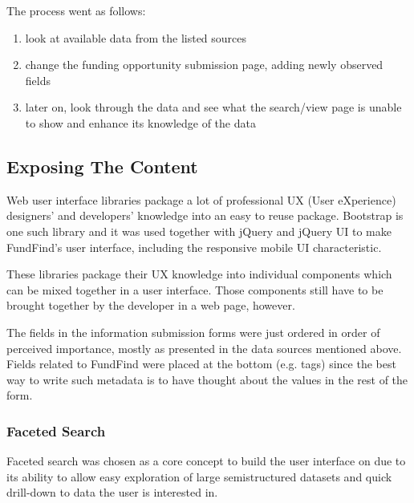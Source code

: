 The process went as follows:
\begin{enumerate}
\item look at available data from the listed sources
\item change the funding opportunity submission page, adding newly observed fields
\item later on, look through the data and see what the search/view page is unable to show and enhance its knowledge of the data
\end{enumerate}

\subsection{Exposing The Content}
\label{design-ui-exposing-the-content}
Web user interface libraries package a lot of professional UX (User eXperience) designers' and developers' knowledge into an easy to reuse package. Bootstrap \cite{bootstrap} is one such library and it was used together with jQuery \cite{jquery} and jQuery UI\cite{jquery-ui} to make FundFind's user interface, including the responsive mobile UI characteristic.

These libraries package their UX knowledge into individual components which can be mixed together in a user interface. Those components still have to be brought together by the developer in a web page, however.

The fields in the information submission forms were just ordered in order of perceived importance, mostly as presented in the data sources mentioned above. Fields related to FundFind were placed at the bottom (e.g. tags) since the best way to write such metadata is to have thought about the values in the rest of the form.

\subsubsection{Faceted Search}
\label{faceted-search}
Faceted search \cite{faceted} was chosen as a core concept to build the user interface on due to its ability to allow easy exploration of large semistructured datasets and quick drill-down to data the user is interested in.

